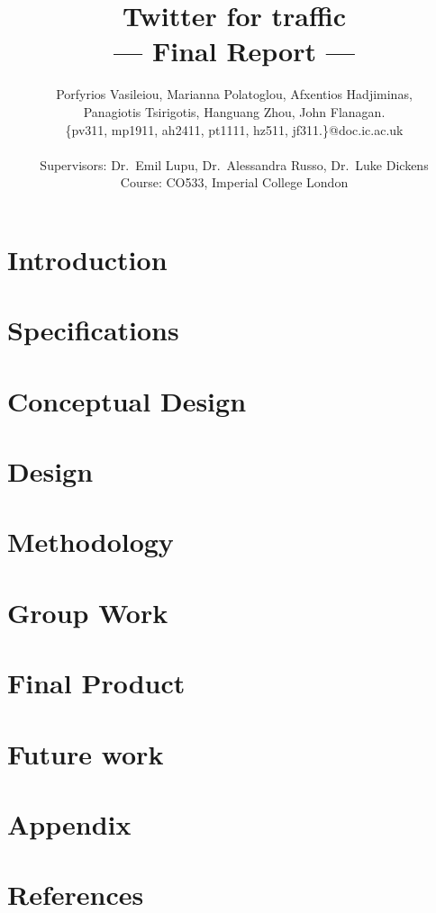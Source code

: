 \documentclass[a4paper,11pt]{article}
\title{Twitter for traffic\\\Large{--- Final Report ---}}
\author{Porfyrios Vasileiou, Marianna Polatoglou, Afxentios Hadjiminas,\\
        Panagiotis Tsirigotis, Hanguang Zhou, John Flanagan.\\
       \{pv311, mp1911, ah2411, pt1111, hz511, jf311.\}@doc.ic.ac.uk\\ \\
       \small{Supervisors: Dr.\ Emil Lupu, Dr.\ Alessandra Russo, Dr.\ Luke Dickens}\\
       \small{Course: CO533, Imperial College London}
}
\begin{document}
\maketitle
\pagebreak
\tableofcontents
\pagebreak
\section{Introduction}
	

\pagebreak
\section{Specifications}
	

\pagebreak
\section{Conceptual Design}
	

\pagebreak
\section{Design}
	

\pagebreak
\section{Methodology}
	

\pagebreak
\section{Group Work}
	
	
\pagebreak
\section{Final Product}
	


\pagebreak
\section{Future work}
    
\pagebreak

\section{Appendix}
	

\pagebreak	
\section{References}
	\vspace{-20pt}
	\def\refname{}
	
	
\end{document}
